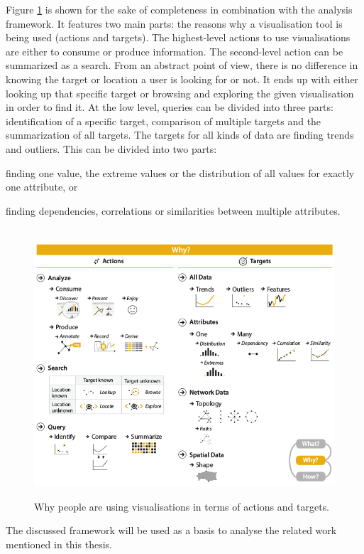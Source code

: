 Figure \ref{fig:why} is shown for the sake of completeness in combination with the analysis framework. It features two main parts: the reasons why a visualisation tool is being used (actions and targets). The highest-level actions to use visualisations are either to consume or produce information. The second-level action can be summarized as a search. From an abstract point of view, there is no difference in knowing the target or location a user is looking for or not. It ends up with either looking up that specific target or browsing and exploring the given visualisation in order to find it. At the low level, queries can be divided into three parts: identification of a specific target, comparison of multiple targets and the summarization of all targets.
The targets for all kinds of data are finding trends and outliers. This can be divided into two parts:
\begin{enumerate*}[label={(\arabic*)}]
\item finding one value, the extreme values or the distribution of all values for exactly one attribute, or
\item finding dependencies, correlations or similarities between multiple attributes.
\end{enumerate*}

\begin{figure}[!htb]
\centering
\includegraphics[height=10cm,keepaspectratio]{images/basics/why.png}
\caption[
    Why people are using visualisations in terms of actions and targets .
]{Why people are using visualisations in terms of actions and targets.}
\label{fig:why}
\end{figure}

The discussed framework will be used as a basis to analyse the related work mentioned in this thesis.

